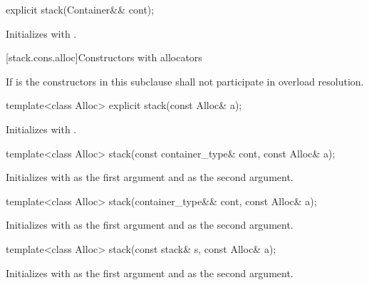 %
\begin{itemdecl}
explicit stack(Container&& cont);
\end{itemdecl}

\begin{itemdescr}
\pnum
\effects
Initializes  with .
\end{itemdescr}

[stack.cons.alloc]{Constructors with allocators}

\pnum
If  is 
the constructors in this subclause shall not participate in overload resolution.

%
\begin{itemdecl}
template<class Alloc> explicit stack(const Alloc& a);
\end{itemdecl}

\begin{itemdescr}
\pnum
\effects
Initializes  with .
\end{itemdescr}

%
\begin{itemdecl}
template<class Alloc> stack(const container_type& cont, const Alloc& a);
\end{itemdecl}

\begin{itemdescr}
\pnum
\effects
Initializes  with  as the first argument and  as the
second argument.
\end{itemdescr}

%
\begin{itemdecl}
template<class Alloc> stack(container_type&& cont, const Alloc& a);
\end{itemdecl}

\begin{itemdescr}
\pnum
\effects
Initializes  with  as the first argument and 
as the second argument.
\end{itemdescr}

%
\begin{itemdecl}
template<class Alloc> stack(const stack& s, const Alloc& a);
\end{itemdecl}

\begin{itemdescr}
\pnum
\effects
Initializes  with  as the first argument and 
as the second argument.
\end{itemdescr}

